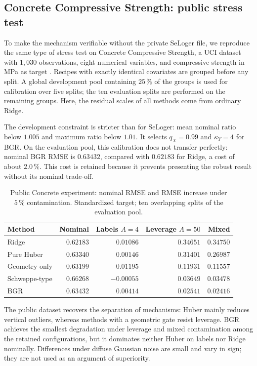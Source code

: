 \subsection{Concrete Compressive Strength: public stress test}
To make the mechanism verifiable without the private SeLoger file, we reproduce the same type of stress test on Concrete Compressive Strength, a UCI dataset with $1{,}030$ observations, eight numerical variables, and compressive strength in MPa as target \citep{yeh1998concrete}. Recipes with exactly identical covariates are grouped before any split. A global development pool containing $25\,\%$ of the groups is used for calibration over five splits; the ten evaluation splits are performed on the remaining groups. Here, the residual scales of all methods come from ordinary Ridge.

The development constraint is stricter than for SeLoger: mean nominal ratio below $1.005$ and maximum ratio below $1.01$. It selects $q_X=0.99$ and $\kappa_Y=4$ for BGR. On the evaluation pool, this calibration does not transfer perfectly: nominal BGR RMSE is $0.63432$, compared with $0.62183$ for Ridge, a cost of about $2.0\,\%$. This cost is retained because it prevents presenting the robust result without its nominal trade-off.

\begin{table}[H]
\centering
\caption{Public Concrete experiment: nominal RMSE and RMSE increase under $5\,\%$ contamination. Standardized target; ten overlapping splits of the evaluation pool.}
\label{tab:concrete-public}
\scriptsize
\begin{tabular}{@{}lrrrr@{}}
\toprule
Method & Nominal & Labels $A=4$ & Leverage $A=50$ & Mixed \\
\midrule
Ridge & $0.62183$ & $0.01086$ & $0.34651$ & $0.34750$ \\
Pure Huber & $0.63340$ & $\mathbf{0.00146}$ & $0.31401$ & $0.26987$ \\
Geometry only & $0.63199$ & $0.01195$ & $0.11931$ & $0.11557$ \\
Schweppe-type & $0.66268$ & $-0.00055$ & $0.03649$ & $0.03478$ \\
BGR & $0.63432$ & $0.00414$ & $\mathbf{0.02541}$ & $\mathbf{0.02416}$ \\
\bottomrule
\end{tabular}
\end{table}

The public dataset recovers the separation of mechanisms: Huber mainly reduces vertical outliers, whereas methods with a geometric gate resist leverage. BGR achieves the smallest degradation under leverage and mixed contamination among the retained configurations, but it dominates neither Huber on labels nor Ridge nominally. Differences under diffuse Gaussian noise are small and vary in sign; they are not used as an argument of superiority.

